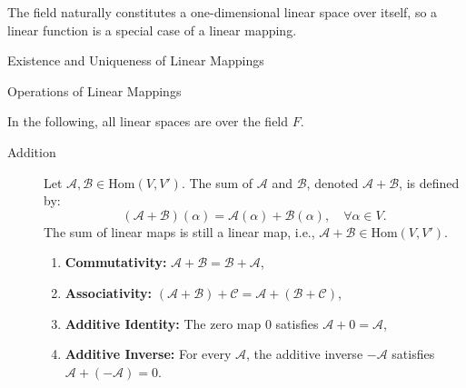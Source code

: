 \documentclass[11pt]{../../TexTemplate/elegantbook} %
\begin{document}
\begin{remark}
    The field naturally constitutes a one-dimensional linear space over itself, 
    so a linear function is a special case of a linear mapping.
\end{remark}




\begin{leftbarTitle}{Existence and Uniqueness of Linear Mappings}\end{leftbarTitle}

\begin{leftbarTitle}{Operations of Linear Mappings}\end{leftbarTitle}
In the following, all linear spaces are over the field \(F\).
\begin{description}
    \item[Addition] 
        Let \(\mathcal{A}, \mathcal{B} \in \mathrm{Hom}(V,V')\). 
        The sum of \(\mathcal{A}\) and \(\mathcal{B}\), denoted \(\mathcal{A+B}\), is defined by:
        \[
        (\mathcal{A+B})(\alpha) = \mathcal{A}(\alpha) + \mathcal{B}(\alpha), \quad \forall \alpha \in V.
        \]
        The sum of linear maps is still a linear map, i.e., \(\mathcal{A+B} \in \mathrm{Hom}(V,V')\).
        \begin{enumerate}
            \item \textbf{Commutativity:} \(\mathcal{A+B = B+A}\),
            \item \textbf{Associativity:} \(\mathcal{(A+B)+C = A+(B+C)}\),
            \item \textbf{Additive Identity:} The zero map \(\mathcal{0}\) satisfies \(\mathcal{A+0 = A}\),
            \item \textbf{Additive Inverse:} For every \(\mathcal{A}\), the additive inverse \(-\mathcal{A}\) 
                satisfies \(\mathcal{A+(-A) = 0}\).
        \end{enumerate}


\end{description}
\end{document}
